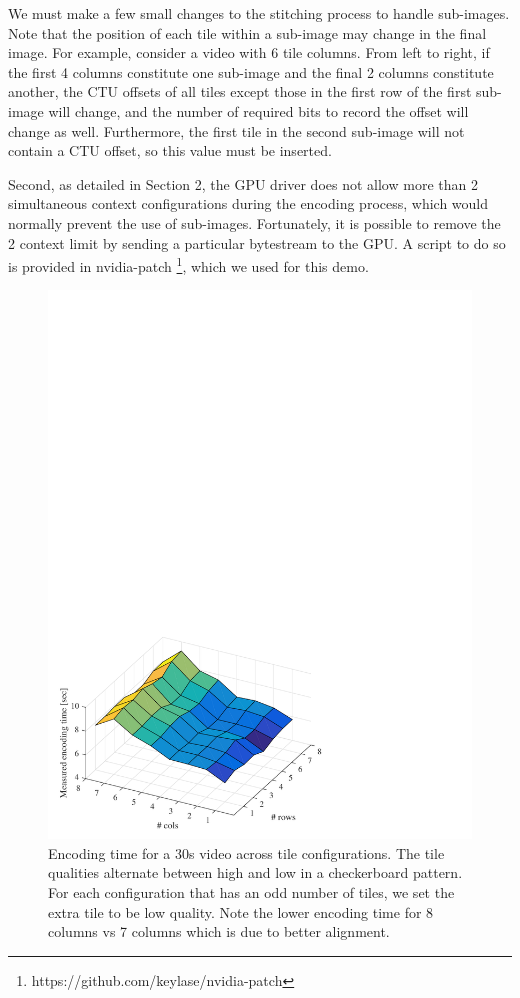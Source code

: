 We must make a few small changes to the stitching process to handle sub-images. Note that the position of each tile within a sub-image may change in the final image. For example, consider a video with 6 tile columns. From left to right, if the first 4 columns constitute one sub-image and the final 2 columns constitute another, the CTU offsets of all tiles except those in the first row of the first sub-image will change, and the number of required bits to record the offset will change as well. Furthermore, the first tile in the second sub-image will not contain a CTU offset, so this value must be inserted.

Second, as detailed in Section 2, the GPU driver does not allow more than 2 simultaneous context configurations during the encoding process, which would normally prevent the use of sub-images. Fortunately, it is possible to remove the 2 context limit by sending a particular bytestream to the GPU. A script to do so is provided in nvidia-patch \footnote{https://github.com/keylase/nvidia-patch}, which we used for this demo.

\begin{figure}[t]
	\includegraphics[width=\columnwidth]{figures/times_v1.pdf}
	\caption{Encoding time for a 30s video across tile configurations. The tile qualities alternate between high and low in a checkerboard pattern. For each configuration that has an odd number of tiles, we set the extra tile to be low quality. Note the lower encoding time for 8 columns vs 7 columns which is due to better alignment.}
	\label{fig:time}
\end{figure}

